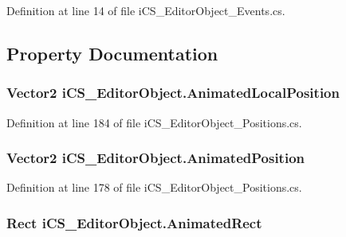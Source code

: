 Definition at line 14 of file i\+C\+S\+\_\+\+Editor\+Object\+\_\+\+Events.\+cs.



\subsection{Property Documentation}
\hypertarget{classi_c_s___editor_object_ae7596350b496344c8764048bb4426f22}{
\subsubsection[{Animated\+Local\+Position}]{\setlength{\rightskip}{0pt plus 5cm}Vector2 i\+C\+S\+\_\+\+Editor\+Object.\+Animated\+Local\+Position\hspace{0.3cm}{\ttfamily [get]}}}\label{classi_c_s___editor_object_ae7596350b496344c8764048bb4426f22}


Definition at line 184 of file i\+C\+S\+\_\+\+Editor\+Object\+\_\+\+Positions.\+cs.

\hypertarget{classi_c_s___editor_object_a9b0ed49f07ba891a83df1c53df307724}{
\subsubsection[{Animated\+Position}]{\setlength{\rightskip}{0pt plus 5cm}Vector2 i\+C\+S\+\_\+\+Editor\+Object.\+Animated\+Position\hspace{0.3cm}{\ttfamily [get]}}}\label{classi_c_s___editor_object_a9b0ed49f07ba891a83df1c53df307724}


Definition at line 178 of file i\+C\+S\+\_\+\+Editor\+Object\+\_\+\+Positions.\+cs.

\hypertarget{classi_c_s___editor_object_a8134259aaa5ee2faa9a1eda5f6576f83}{
\subsubsection[{Animated\+Rect}]{\setlength{\rightskip}{0pt plus 5cm}Rect i\+C\+S\+\_\+\+Editor\+Object.\+Animated\+Rect\hspace{0.3cm}{\ttfamily [get]}}}\label{classi_c_s___editor_object_a8134259aaa5ee2faa9a1eda5f6576f83}


